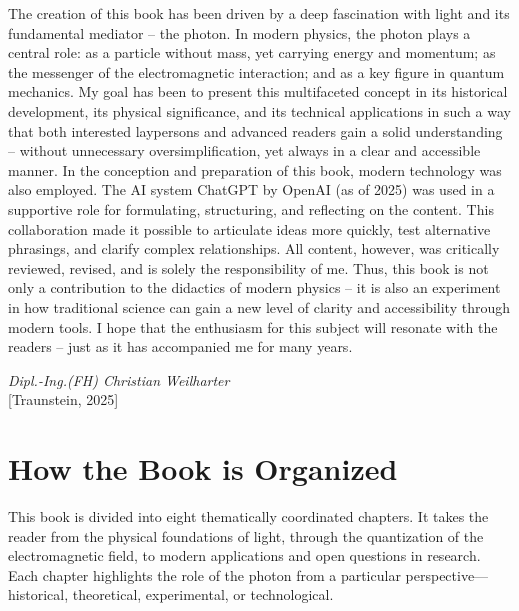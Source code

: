 The creation of this book has been driven by a deep fascination with light and its fundamental mediator – the photon. In modern physics, the photon plays a central role: as a particle without mass, yet carrying energy and momentum; as the messenger of the electromagnetic interaction; and as a key figure in quantum mechanics.  
\noindent
My goal has been to present this multifaceted concept in its historical development, its physical significance, and its technical applications in such a way that both interested laypersons and advanced readers gain a solid understanding – without unnecessary oversimplification, yet always in a clear and accessible manner.  
\noindent
In the conception and preparation of this book, modern technology was also employed. The AI system ChatGPT by OpenAI (as of 2025) was used in a supportive role for formulating, structuring, and reflecting on the content. This collaboration made it possible to articulate ideas more quickly, test alternative phrasings, and clarify complex relationships.  
All content, however, was critically reviewed, revised, and is solely the responsibility of me.  
\noindent
Thus, this book is not only a contribution to the didactics of modern physics – it is also an experiment in how traditional science can gain a new level of clarity and accessibility through modern tools.  
\noindent
I hope that the enthusiasm for this subject will resonate with the readers – just as it has accompanied me for many years.  

\begin{flushright}
	\textit{Dipl.-Ing.(FH) Christian Weilharter} \\
	\vspace{0.5em}
	[Traunstein, 2025]
\end{flushright}
\newpage
\noindent
\chapter*{How the Book is Organized}

This book is divided into eight thematically coordinated chapters. It takes the reader from the physical foundations of light, through the quantization of the electromagnetic field, to modern applications and open questions in research. Each chapter highlights the role of the photon from a particular perspective—historical, theoretical, experimental, or technological.

